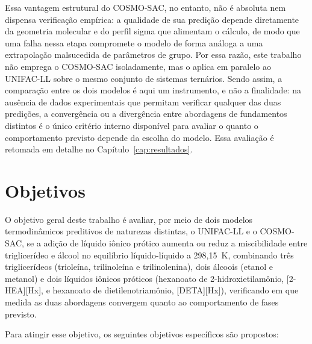 Essa vantagem estrutural do COSMO-SAC, no entanto, não é absoluta nem dispensa verificação empírica: a qualidade de sua predição depende diretamente da geometria molecular e do perfil sigma que alimentam o cálculo, de modo que uma falha nessa etapa compromete o modelo de forma análoga a uma extrapolação malsucedida de parâmetros de grupo. Por essa razão, este trabalho não emprega o COSMO-SAC isoladamente, mas o aplica em paralelo ao UNIFAC-LL sobre o mesmo conjunto de sistemas ternários. Sendo assim, a comparação entre os dois modelos é aqui um instrumento, e não a finalidade: na ausência de dados experimentais que permitam verificar qualquer das duas predições, a convergência ou a divergência entre abordagens de fundamentos distintos é o único critério interno disponível para avaliar o quanto o comportamento previsto depende da escolha do modelo. Essa avaliação é retomada em detalhe no Capítulo~\ref{cap:resultados}.
\section{Objetivos}
\label{sec:objetivos}
 
O objetivo geral deste trabalho é avaliar, por meio de dois modelos termodinâmicos preditivos de naturezas distintas, o UNIFAC-LL e o COSMO-SAC, se a adição de líquido iônico prótico aumenta ou reduz a miscibilidade entre triglicerídeo e álcool no equilíbrio líquido-líquido a 298,15~K, combinando três triglicerídeos (trioleína, trilinoleína e trilinolenina), dois álcoois (etanol e metanol) e dois líquidos iônicos próticos (hexanoato de 2-hidroxietilamônio, [2-HEA][Hx], e hexanoato de dietilenotriamônio, [DETA][Hx]), verificando em que medida as duas abordagens convergem quanto ao comportamento de fases previsto.
 
Para atingir esse objetivo, os seguintes objetivos específicos são propostos:
 
